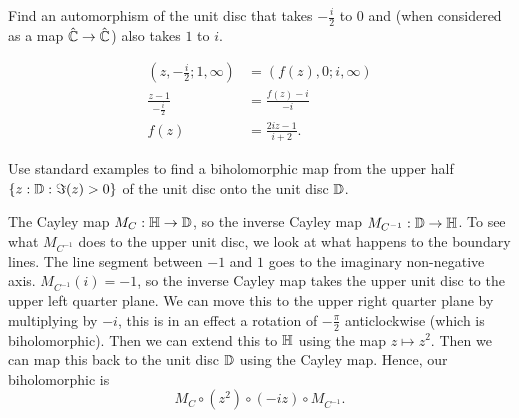 
\setcounter{question}{2}
\question Find an automorphism of the unit disc that takes $-\frac i2$ to $0$ and (when considered as a map $\hat{\mathbb{C}} \to \hat{\mathbb{C}}$) also takes $1$ to $i$.
\begin{solution}
    \begin{align*}
        (z, -\frac i2; 1, \infty) &= (f(z), 0; i, \infty) \\
        \frac{z - 1}{-\frac i2} &= \frac{f(z) - i}{-i} \\
        f(z) &= \frac{2iz - 1}{i + 2}.
    \end{align*}
\end{solution}

\setcounter{question}{6}
\question Use standard examples to find a biholomorphic map from the upper half $\{ z: \mathbb{D} : \Im(z) > 0 \}$ of the unit disc onto the unit disc $\mathbb{D}$.
\begin{solution}
    The Cayley map $M_C: \mathbb{H} \to \mathbb{D}$, so the inverse Cayley map $M_{C^{-1}}: \mathbb{D} \to \mathbb{H}$. 
    To see what $M_{C^{-1}}$ does to the upper unit disc, we look at what happens to the boundary lines.
    The line segment between $-1$ and $1$ goes to the imaginary non-negative axis.
    $M_{C^{-1}}(i) = -1$, so the inverse Cayley map takes the upper unit disc to the upper left quarter plane. 
    We can move this to the upper right quarter plane by multiplying by $-i$, this is in an effect a rotation of $-\frac{\pi}2$ anticlockwise (which is biholomorphic).
    Then we can extend this to $\mathbb{H}$ using the map $z \mapsto z^2$.
    Then we can map this back to the unit disc $\mathbb{D}$ using the Cayley map.
    Hence, our biholomorphic is
    \[ M_C \circ (z^2) \circ (-iz) \circ M_{C^{-1}}. \]
\end{solution}

